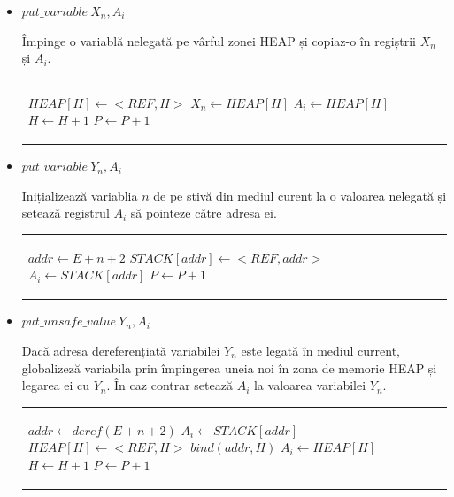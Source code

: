 \documentclass[12pt,a4paper,twoside]{report}
\begin{document}
\begin{itemize}
	\item \(put\_variable\  X_n, A_i\) \\
	\begin{minipage}{0.45\textwidth}
		   Împinge o variablă nelegată pe vârful zonei HEAP și copiaz-o în regiștrii \(X_n\) și \(A_i\).
	\end{minipage}%
	\hfill
	\begin{minipage}{0.45\textwidth}
	\begin{tabular}{|p{\textwidth}}
	\begin{algorithmic}
		\State $HEAP[H] \leftarrow <REF, H> $
    		\State $X_n \leftarrow HEAP[H]$
		\State $A_i \leftarrow HEAP[H]$
		\State $H \leftarrow H + 1$
		\State $P \leftarrow P + 1$
	\end{algorithmic}
	\end{tabular}
	\end{minipage}%

	\item \(put\_variable\ Y_n, A_i\)\\
	\begin{minipage}{0.45\textwidth}
	Inițializează variablia \(n\) de pe stivă din mediul curent la o valoarea nelegată și  setează registrul \(A_i\) să pointeze către adresa ei.
	\end{minipage}%
	\hfill
	\begin{minipage}{0.45\textwidth}
	\begin{tabular}{|p{\textwidth}}
	\begin{algorithmic}
		\State $addr \leftarrow E + n + 2$
    		\State $STACK[addr] \leftarrow <REF, addr>$
		\State $A_i \leftarrow STACK[addr]$
		\State $P \leftarrow P + 1$
	\end{algorithmic}
	\end{tabular}
	\end{minipage}%
	
	\item \(put\_unsafe\_value\ Y_n, A_i\)\\
	\begin{minipage}{0.45\textwidth}
	Dacă adresa dereferențiată variabilei \(Y_n\) este legată în mediul current, globalizeză variabila prin împingerea uneia noi în zona de memorie HEAP și legarea ei cu \(Y_n\). În caz contrar setează \(A_i\) la valoarea variabilei \(Y_n\).
	\end{minipage}%
	\hfill
	\begin{minipage}{0.45\textwidth}
	\begin{tabular}{|p{\textwidth}}
	\begin{algorithmic}
		\State $addr \leftarrow deref(E + n + 2)$
		\If {$addr < E$}
			\State $A_i \leftarrow STACK[addr]$
		\Else
			\State $HEAP[H] \leftarrow <REF, H>$
			\State $bind(addr, H)$
			\State $A_i \leftarrow HEAP[H]$
			\State $H \leftarrow H + 1 $
		\EndIf
		\State $P \leftarrow P + 1$
	\end{algorithmic}
	\end{tabular}
	\end{minipage}%
	

\end{itemize}
\end{document}
